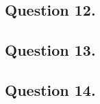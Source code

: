 \documentclass{mhk}
\begin{document}
\subsection*{Question 12.}





\subsection*{Question 13.}





\subsection*{Question 14.}




\end{document}
